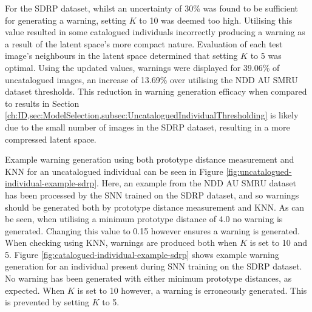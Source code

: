 For the SDRP dataset, whilst an uncertainty of 30\% was found to be sufficient for generating a warning, setting $K$ to 10 was deemed too high. Utilising this value resulted in some catalogued individuals incorrectly producing a warning as a result of the latent space's more compact nature. Evaluation of each test image's neighbours in the latent space determined that setting $K$ to 5 was optimal. Using the updated values, warnings were displayed for 39.06\% of uncatalogued images, an increase of 13.69\% over utilising the NDD AU SMRU dataset thresholds. This reduction in warning generation efficacy when compared to results in Section \ref{ch:ID,sec:ModelSelection,subsec:UncataloguedIndividualThresholding} is likely due to the small number of images in the SDRP dataset, resulting in a more compressed latent space.

Example warning generation using both prototype distance measurement and KNN for an uncatalogued individual can be seen in Figure \ref{fig:uncatalogued-individual-example-sdrp}. Here, an example from the NDD AU SMRU dataset has been processed by the SNN trained on the SDRP dataset, and so warnings should be generated both by prototype distance measurement and KNN. As can be seen, when utilising a minimum prototype distance of 4.0 no warning is generated. Changing this value to 0.15 however ensures a warning is generated. When checking using KNN, warnings are produced both when $K$ is set to 10 and 5. Figure \ref{fig:catalogued-individual-example-sdrp} shows example warning generation for an individual present during SNN training on the SDRP dataset. No warning has been generated with either minimum prototype distances, as expected. When $K$ is set to 10 however, a warning is erroneously generated. This is prevented by setting $K$ to 5. 

